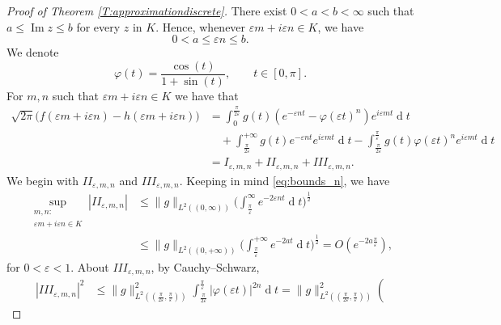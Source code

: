 \documentclass[10pt,a4paper]{amsart}
\begin{document}
    \begin{proof}[Proof of Theorem \ref{T:approximationdiscrete}]
    There exist $0<a<b<\infty$ such that
    \(
    a\leqslant\operatorname{Im}z\leqslant b
    \) for every $z$ in $K$. Hence, whenever $\varepsilon m+i\varepsilon n\in K$, we  have 
    \begin{equation}\label{eq:bounds_n}
    0<a\leqslant\varepsilon n\leqslant b.
    \end{equation}
    We denote
    \[
    \varphi(t)=\frac{\cos(t)}{1+\sin(t)}, \qquad t\in[0,\pi].
    \]
    For $m,n$ such that $\varepsilon m+i\varepsilon n\in K$ we have that
    \begin{align*}
    \sqrt{2\pi}\big(f(\varepsilon m+i\varepsilon n)-h(\varepsilon m+i\varepsilon n)\big)
    &= \int_0^{\frac{\pi}{2\varepsilon}}
    g(t)
    (
    e^{-\varepsilon nt}-\varphi(\varepsilon t)^n
    )e^{i\varepsilon mt}\operatorname{d}\!t\\
    &\quad +  \int_{\frac{\pi}{2\varepsilon}}^{+\infty} g(t) e^{-\varepsilon n t }e^{i\varepsilon m t}\operatorname{d}\!t-
    \int_{\frac{\pi}{2\varepsilon}}^{\frac\pi\varepsilon} g(t)\varphi(\varepsilon t)^ne^{i\varepsilon m t}\operatorname{d}\!t\\
    &=I_{\varepsilon,m,n}
    +
    I\!I_{\varepsilon,m,n} 
    +
    I\!I\!I_{\varepsilon,m,n} 
    .
    \end{align*}
    We begin with $I\!I_{\varepsilon,m,n}$ and $
    I\!I\!I_{\varepsilon,m,n}$. Keeping in mind \eqref{eq:bounds_n}, we have
    \begin{align}\label{eq:II_bounds}
    \nonumber\sup_{\substack{m,n:\\
    \varepsilon m+i\varepsilon n\in K}} |I\!I_{\varepsilon,m,n}|&
    \leqslant \|g\|_{L^2((0,\infty))}\Big(\int_{\frac \pi{\varepsilon}}^{\infty}e^{-2\varepsilon n t}\operatorname{d}\!t\Big)^\frac{1}{2}\\
    &\leqslant \|g\|_{L^2((0,+\infty))}\Big(\int_{\frac \pi{\varepsilon}}^{+\infty}e^{-2a t}\operatorname{d}\!t\Big)^\frac{1}{2}=O(e^{-2a\frac{\pi}{\varepsilon}}),
    \end{align}
    for $0<\varepsilon<1$. About $
    I\!I\!I_{\varepsilon,m,n}$, by Cauchy--Schwarz,
    \begin{align}\label{Eq:IIIpt1}
        |I\!I\!I_{\varepsilon,m,n}|^2&\leqslant
        \|g\|_{L^2((\frac{\pi}{2\varepsilon},\frac{\pi}{\varepsilon}))}^2
        \int_{\frac{\pi}{2\varepsilon}}^{\frac{\pi}{\varepsilon}}
    |\varphi(\varepsilon t)|^{2n}
    \operatorname{d}\!t=
    \|g\|_{L^2((\frac{\pi}{2\varepsilon},\frac{\pi}{\varepsilon}))}^2\left(

\end{align}
\end{proof}
\end{document}

